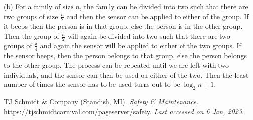 \documentclass[a4paper]{exam}
\begin{document}
\begin{questions}
\begin{solution}
    (b) For a family of size $n$, the family can be divided into two such that there are two groups of size $ \frac{n}{2} $ and then the sensor can be applied to either of the group. If it beeps then the person is in that group, else the person is in the other group. Then the group of $ \frac{n}{2} $ will again be divided into two such that there are two groups of $ \frac{n}{4} $ and again the sensor will be applied to either of the two groups. If the sensor beeps, then the person belongs to that group, else the person belongs to the other group. The process can be repeated until we are left with two individuals, and the sensor can then be used on either of the two. Then the least number of times the sensor has to be used turns out to be $ \log_{2}n + 1$.
  \end{solution}
\end{questions}

\begin{thebibliography}{9}
  TJ Schmidt \& Company (Standish, MI). \emph{Safety \& Maintenance}. \url{https://tjschmidtcarnival.com/pageserver/safety}. \textit{Last accessed on 6 Jan, 2023}.
\end{thebibliography}
\end{document}
